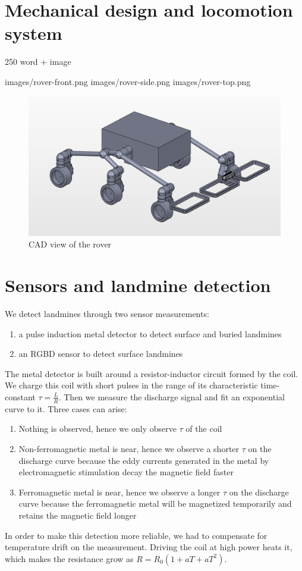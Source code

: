 \section{Mechanical design and locomotion system}
250 word + image

images/rover-front.png
images/rover-side.png
images/rover-top.png

\begin{figure}[htbp]
   \caption{\label{fig:rover} CAD view of the rover}
   \includegraphics[width=\textwidth]{images/rover}
\end{figure}

\section{Sensors and landmine detection}
We detect landmines through two sensor measurements:
\begin{enumerate}
    \item a pulse induction metal detector to detect surface and buried landmines
    \item an RGBD sensor to detect surface landmines
\end{enumerate}

The metal detector is built around a resistor-inductor circuit formed by the coil.
We charge this coil with short pulses in the range of its characteristic time-constant $\tau = \frac{L}{R}$.
Then we measure the discharge signal and fit an exponential curve to it.
Three cases can arise:
\begin{enumerate}
    \item Nothing is observed, hence we only observe $\tau$ of the coil
    \item Non-ferromagnetic metal is near, hence we observe a shorter $\tau$ on the discharge curve because the eddy currents generated in the metal by electromagnetic stimulation decay the magnetic field faster
    \item Ferromagnetic metal is near, hence we observe a longer $\tau$ on the discharge curve because the ferromagnetic metal will be magnetized temporarily and retains the magnetic field longer
\end{enumerate}
In order to make this detection more reliable, we had to compensate for temperature drift on the measurement.
Driving the coil at high power heats it, which makes the resistance grow as $R = R_0 (1 + a T + a T^2)$.

